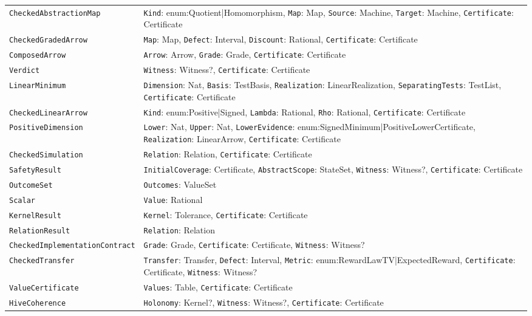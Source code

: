 \documentclass[11pt]{article}
\newcommand{\code}[1]{\texttt{#1}}
\theoremstyle{definition}
\theoremstyle{plain}
\begin{document}
{\begin{longtable}{>{\raggedright\arraybackslash}p{4.9cm}>{\raggedright\arraybackslash}p{9.1cm}}
\code{CheckedAbstractionMap} & \code{Kind}: enum:Quotient|\allowbreak{}Homomorphism, \code{Map}: Map, \code{Source}: Machine, \code{Target}: Machine, \code{Certificate}: Certificate\\
\code{CheckedGradedArrow} & \code{Map}: Map, \code{Defect}: Interval, \code{Discount}: Rational, \code{Certificate}: Certificate\\
\code{ComposedArrow} & \code{Arrow}: Arrow, \code{Grade}: Grade, \code{Certificate}: Certificate\\
\code{Verdict} & \code{Witness}: Witness?, \code{Certificate}: Certificate\\
\code{LinearMinimum} & \code{Dimension}: Nat, \code{Basis}: TestBasis, \code{Realization}: LinearRealization, \code{SeparatingTests}: TestList, \code{Certificate}: Certificate\\
\code{CheckedLinearArrow} & \code{Kind}: enum:Positive|\allowbreak{}Signed, \code{Lambda}: Rational, \code{Rho}: Rational, \code{Certificate}: Certificate\\
\code{PositiveDimension} & \code{Lower}: Nat, \code{Upper}: Nat, \code{LowerEvidence}: enum:SignedMinimum|\allowbreak{}PositiveLowerCertificate, \code{Realization}: LinearArrow, \code{Certificate}: Certificate\\
\code{CheckedSimulation} & \code{Relation}: Relation, \code{Certificate}: Certificate\\
\code{SafetyResult} & \code{InitialCoverage}: Certificate, \code{AbstractScope}: StateSet, \code{Witness}: Witness?, \code{Certificate}: Certificate\\
\code{OutcomeSet} & \code{Outcomes}: ValueSet\\
\code{Scalar} & \code{Value}: Rational\\
\code{KernelResult} & \code{Kernel}: Tolerance, \code{Certificate}: Certificate\\
\code{RelationResult} & \code{Relation}: Relation\\
\code{CheckedImplementationContract} & \code{Grade}: Grade, \code{Certificate}: Certificate, \code{Witness}: Witness?\\
\code{CheckedTransfer} & \code{Transfer}: Transfer, \code{Defect}: Interval, \code{Metric}: enum:RewardLawTV|\allowbreak{}ExpectedReward, \code{Certificate}: Certificate, \code{Witness}: Witness?\\
\code{ValueCertificate} & \code{Values}: Table, \code{Certificate}: Certificate\\
\code{HiveCoherence} & \code{Holonomy}: Kernel?, \code{Witness}: Witness?, \code{Certificate}: Certificate\\

\end{longtable}}
\end{document}
